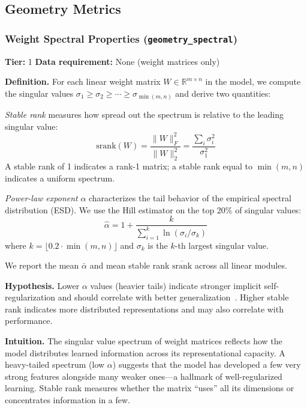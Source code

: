 \documentclass{article}
\begin{document}
\subsection{Geometry Metrics}
\label{app:geometry}

\subsubsection{Weight Spectral Properties (\texttt{geometry\_spectral})}
\label{app:spectral}

\textbf{Tier:} 1 \quad \textbf{Data requirement:} None (weight matrices only)

\textbf{Definition.}
For each linear weight matrix $W \in \mathbb{R}^{m \times n}$ in the model, we compute the singular values $\sigma_1 \geq \sigma_2 \geq \cdots \geq \sigma_{\min(m,n)}$ and derive two quantities:

\emph{Stable rank} measures how spread out the spectrum is relative to the leading singular value:
\begin{equation}
  \text{srank}(W) = \frac{\|W\|_F^2}{\|W\|_2^2} = \frac{\sum_i \sigma_i^2}{\sigma_1^2}
\end{equation}
A stable rank of 1 indicates a rank-1 matrix; a stable rank equal to $\min(m,n)$ indicates a uniform spectrum.

\emph{Power-law exponent} $\alpha$ characterizes the tail behavior of the empirical spectral distribution (ESD). We use the Hill estimator on the top 20\% of singular values:
\begin{equation}
  \hat\alpha = 1 + \frac{k}{\sum_{i=1}^{k} \ln(\sigma_i / \sigma_k)}
\end{equation}
where $k = \lfloor 0.2 \cdot \min(m,n) \rfloor$ and $\sigma_k$ is the $k$-th largest singular value.

We report the mean $\bar\alpha$ and mean stable rank $\overline{\text{srank}}$ across all linear modules.

\textbf{Hypothesis.}
Lower $\alpha$ values (heavier tails) indicate stronger implicit self-regularization and should correlate with better generalization~\citep{martin2021implicit}. Higher stable rank indicates more distributed representations and may also correlate with performance.

\textbf{Intuition.}
The singular value spectrum of weight matrices reflects how the model distributes learned information across its representational capacity. A heavy-tailed spectrum (low $\alpha$) suggests that the model has developed a few very strong features alongside many weaker ones---a hallmark of well-regularized learning. Stable rank measures whether the matrix ``uses'' all its dimensions or concentrates information in a few.
\end{document}
